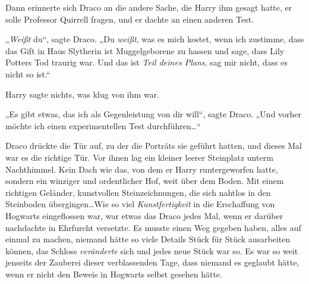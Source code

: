 Dann erinnerte sich Draco an die andere Sache, die Harry ihm gesagt hatte, er solle Professor Quirrell fragen, und er dachte an einen anderen Test.

„\emph{Weißt} du“, sagte Draco. „Du \emph{weißt}, was es mich kostet, wenn ich zustimme, dass das Gift in Haus Slytherin ist Muggelgeborene zu hassen und sage, dass Lily Potters Tod traurig war. Und das ist \emph{Teil deines Plans}, sag mir nicht, dass es nicht so ist.“

Harry sagte nichts, was klug von ihm war.

„Es gibt etwas, das ich als Gegenleistung von dir will“, sagte Draco. „Und vorher möchte ich einen experimentellen Test durchführen…“

\later

Draco drückte die Tür auf, zu der die Porträts sie geführt hatten, und dieses Mal war es die richtige Tür. Vor ihnen lag ein kleiner leerer Steinplatz unterm Nachthimmel. Kein Dach wie das, von dem er Harry runtergeworfen hatte, sondern ein winziger und ordentlicher Hof, weit über dem Boden. Mit einem richtigen Geländer, kunstvollen Steinzeichnungen, die sich nahtlos in den Steinboden übergingen…Wie so viel \emph{Kunstfertigkeit} in die Erschaffung von Hogwarts eingeflossen war, war etwas das Draco jedes Mal, wenn er darüber nachdachte in Ehrfurcht versetzte. Es musste einen Weg gegeben haben, alles auf einmal zu machen, niemand hätte so viele Details Stück für Stück ausarbeiten können, das Schloss \emph{veränderte} sich und jedes neue Stück war so. Es war so weit jenseits der Zauberei dieser verblassenden Tage, dass niemand es geglaubt hätte, wenn er nicht den Beweis in Hogwarts selbst gesehen hätte.

